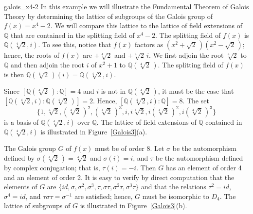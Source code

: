 \begin{example}{galois_x4-2}
In this example we will illustrate the Fundamental Theorem of Galois
Theory by determining the lattice of subgroups of the Galois group of
$f(x) = x^4 - 2$. We will compare this lattice to the lattice of field
extensions of ${\mathbb Q}$ that are contained in the splitting field of
$x^4-2$. The splitting field of $f(x)$ is ${\mathbb Q}( \sqrt[4]{2}, i
)$. To see this, notice that $f(x)$ factors as $(x^2 +
\sqrt{2}\, )(x^2 - \sqrt{2}\, )$; hence, the roots of $f(x)$ are $\pm
\sqrt[4]{2}$ and $\pm \sqrt[4]{2}\, i$. We first adjoin the root
$\sqrt[4]{2}$ to ${\mathbb Q}$ and then adjoin the root $i$ of $x^2 + 1$
to ${\mathbb Q}(\sqrt[4]{2}\, )$. The splitting field of $f(x)$ is then
${\mathbb Q}(\sqrt[4]{2}\, )(i) = {\mathbb Q}( \sqrt[4]{2}, i )$. 
 
 
Since $[ {\mathbb Q}( \sqrt[4]{2}\, ) : {\mathbb Q}] = 4$ and $i$ is not in
${\mathbb Q}( \sqrt[4]{2}\, )$, it must be the case that $[ {\mathbb Q}(
\sqrt[4]{2}, i ): {\mathbb Q}(\sqrt[4]{2}\, )] = 2$. Hence, $[ {\mathbb Q}(
\sqrt[4]{2}, i ):{\mathbb Q}] = 8$. The set
\[
\{ 1, \sqrt[4]{2}, (\sqrt[4]{2}\, )^2, (\sqrt[4]{2}\, )^3, i, i
\sqrt[4]{2}, i (\sqrt[4]{2}\, )^2, i(\sqrt[4]{2}\, )^3 \}
\]
is a basis of ${\mathbb Q}( \sqrt[4]{2}, i )$ over ${\mathbb Q}$. The
lattice of field extensions of ${\mathbb Q}$ contained in ${\mathbb Q}(
\sqrt[4]{2}, i)$ is illustrated in Figure~\ref{Galois3}(a).
 
 
The Galois group $G$ of $f(x)$ must be of order 8. Let $\sigma$ be the
automorphism defined by $\sigma( \sqrt[4]{2}\, ) = \sqrt[4]{2}$ and
$\sigma( i ) = i$, and $\tau$ be the automorphism defined by complex
conjugation; that is, $\tau(i ) = -i$. Then $G$ has an element of
order 4 and an element of order 2. It is easy to verify by direct
computation that the elements of $G$ are $\{ id, \sigma, \sigma^2, 
\sigma^3, \tau, \sigma \tau, \sigma^2 \tau, \sigma^3 \tau \}$ and that
the relations $\tau^2 = id$, $\sigma^4 = id$, and $\tau \sigma \tau =
\sigma^{-1}$ are satisfied; hence, $G$ must be isomorphic to $D_4$.
The lattice of subgroups of $G$ is illustrated in Figure~\ref{Galois3}(b).
\end{example}
 
